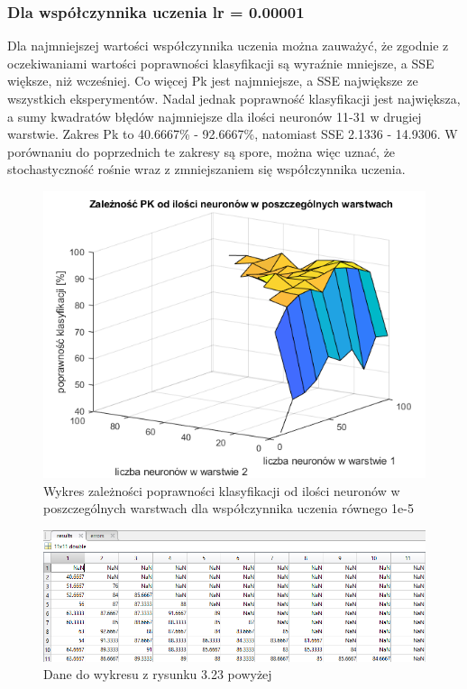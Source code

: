\documentclass[a4paper, 12pt]{article}
\begin{document}
\clearpage

\newpage
\subsubsection{Dla współczynnika uczenia lr = 0.00001}
Dla najmniejszej wartości  współczynnika uczenia można zauważyć, że  zgodnie z oczekiwaniami wartości poprawności klasyfikacji są wyraźnie mniejsze, a SSE większe, niż wcześniej. Co więcej Pk jest najmniejsze, a SSE największe ze wszystkich eksperymentów. Nadal jednak poprawność klasyfikacji jest największa, a sumy kwadratów błędów najmniejsze dla ilości neuronów 11-31 w drugiej warstwie.
Zakres Pk to 40.6667\% - 92.6667\%, natomiast SSE 2.1336 - 14.9306. W porównaniu do poprzednich te zakresy są spore, można więc uznać, że stochastyczność rośnie wraz z zmniejszaniem się współczynnika uczenia.

\begin{figure}[ht]
	\centering
	\includegraphics[width=12cm]{images/lr5 pk}
	\caption{Wykres zależności poprawności klasyfikacji od ilości neuronów w poszczególnych warstwach dla współczynnika uczenia równego 1e-5}
\label{Fig:lr1 pk}
\end{figure}

\begin{figure}[ht]
	\centering
	\includegraphics[width=12cm]{images/lr5 pk dane}
	\caption{Dane do wykresu z rysunku 3.23 powyżej}
\label{Fig:lr1 pk dane}
\end{figure}
\end{document}
